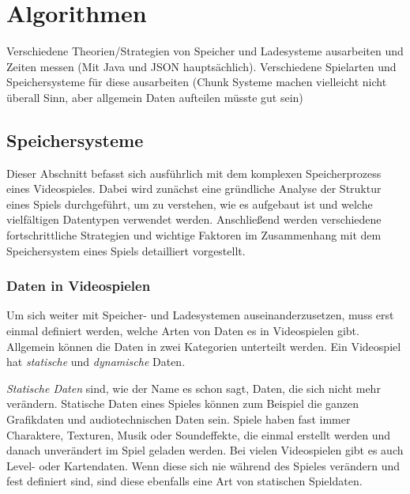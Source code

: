 \chapter{Algorithmen}\label{ch:algorithmen}
Verschiedene Theorien/Strategien von Speicher und Ladesysteme ausarbeiten und Zeiten messen (Mit Java und JSON hauptsächlich). Verschiedene Spielarten und Speichersysteme für diese ausarbeiten (Chunk Systeme machen vielleicht nicht überall Sinn, aber allgemein Daten aufteilen müsste gut sein)





\section{Speichersysteme}\label{sect:speichersysteme}
Dieser Abschnitt befasst sich ausführlich mit dem komplexen Speicherprozess eines Videospieles. Dabei wird zunächst eine gründliche Analyse der Struktur eines Spiels durchgeführt, um zu verstehen, wie es aufgebaut ist und welche vielfältigen Datentypen verwendet werden. Anschließend werden verschiedene fortschrittliche Strategien und wichtige Faktoren im Zusammenhang mit dem Speichersystem eines Spiels detailliert vorgestellt.


\subsection{Daten in Videospielen}
Um sich weiter mit Speicher- und Ladesystemen auseinanderzusetzen, muss erst einmal definiert werden, welche Arten von Daten es in Videospielen gibt. Allgemein können die Daten in zwei Kategorien unterteilt werden. Ein Videospiel hat \textit{statische} und \textit{dynamische} Daten.

\textit{Statische Daten} sind, wie der Name es schon sagt, Daten, die sich nicht mehr verändern. Statische Daten eines Spieles können zum Beispiel die ganzen Grafikdaten und audiotechnischen Daten sein. Spiele haben fast immer Charaktere, Texturen, Musik oder Soundeffekte, die einmal erstellt werden und danach unverändert im Spiel geladen werden. Bei vielen Videospielen gibt es auch Level- oder Kartendaten. Wenn diese sich nie während des Spieles verändern und fest definiert sind, sind diese ebenfalls eine Art von statischen Spieldaten. 

